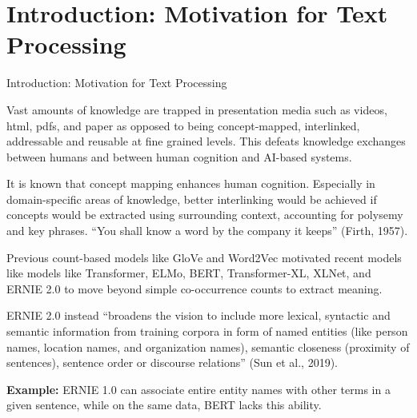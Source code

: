 
\section{Introduction: Motivation for Text Processing}


\begin{frame}{Introduction: Motivation for Text Processing} %



\begin{itemizeSpaced}{7pt}

    \item Vast amounts of knowledge are trapped in presentation media such as videos, html, pdfs, and paper as opposed to being concept-mapped, interlinked, addressable and reusable at fine grained levels. This defeats knowledge exchanges between humans and between human cognition and AI-based systems.
    
    \item It is known that concept mapping enhances human cognition. Especially in domain-specific areas of knowledge, better interlinking would be achieved if concepts would be extracted using surrounding context, accounting for polysemy and key phrases. “You shall know a word by the company it keeps” (Firth, 1957).
    
    
    \item Previous count-based models like GloVe and Word2Vec motivated recent models like models like Transformer, ELMo, BERT, Transformer-XL, XLNet, and ERNIE 2.0 to move beyond simple co-occurrence counts to extract meaning. 
    
    \item ERNIE 2.0 instead “broadens the vision to include more lexical, syntactic and semantic information from training corpora in form of named entities (like person names, location names, and organization names), semantic closeness (proximity of sentences), sentence order or discourse relations” (Sun et al., 2019). 
    
    \item \textbf{Example:} ERNIE 1.0 can associate entire entity names with other terms in a given sentence, while on the same data, BERT lacks this ability.
    
    
\end{itemizeSpaced}
\end{frame}







